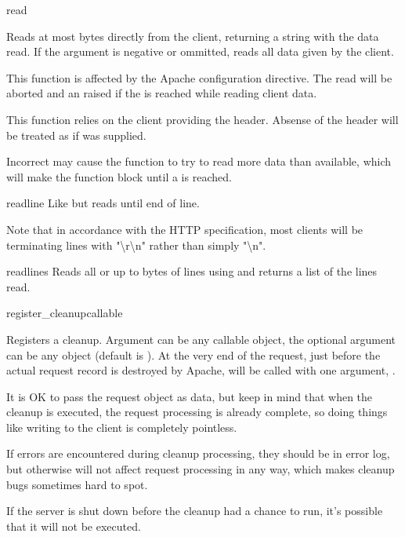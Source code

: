 \begin{methoddesc}[request]{read}{}

Reads at most  bytes directly from the client, returning a
string with the data read. If the  argument is negative or
ommitted, reads all data given by the client.

This function is affected by the  Apache configuration
directive. The read will be aborted and an  raised
if the  is reached while reading client data.

This function relies on the client providing the 
header. Absense of the  header will be treated as
if  was supplied.

Incorrect  may cause the function to try to read
more data than available, which will make the function block until a
 is reached.

\end{methoddesc}

\begin{methoddesc}[request]{readline}{}
Like  but reads until end of line. 
                  
Note that in accordance with the HTTP specification, most clients will
be terminating lines with "\textbackslash r\textbackslash n" rather
than simply "\textbackslash n".

\end{methoddesc}

\begin{methoddesc}[request]{readlines}{}
Reads all or up to  bytes of lines using
 and returns a list of the lines read.
\end{methoddesc}

\begin{methoddesc}[request]{register_cleanup}{callable}

Registers a cleanup. Argument  can be any callable
object, the optional argument  can be any object (default is
). At the very end of the request, just before the actual
request record is destroyed by Apache,  will be called
with one argument, .

It is OK to pass the request object as data, but keep in mind that
when the cleanup is executed, the request processing is already
complete, so doing things like writing to the client is completely
pointless. 

If errors are encountered during cleanup processing, they should be in
error log, but otherwise will not affect request processing in any
way, which makes cleanup bugs sometimes hard to spot.

If the server is shut down before the cleanup had a chance to run,
it's possible that it will not be executed.

\end{methoddesc}

